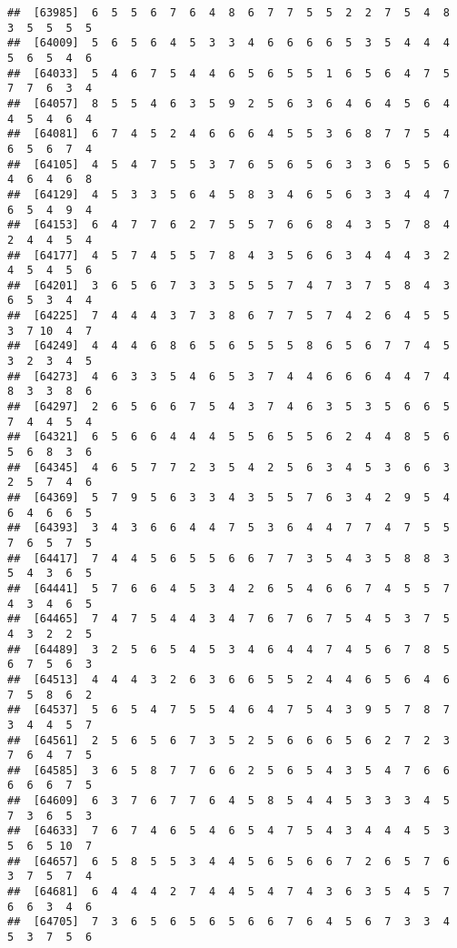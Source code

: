 \documentclass[
]{book}
\begin{document}
\begin{verbatim}
##  [63985]  6  5  5  6  7  6  4  8  6  7  7  5  5  2  2  7  5  4  8  3  5  5  5  5
##  [64009]  5  6  5  6  4  5  3  3  4  6  6  6  6  5  3  5  4  4  4  5  6  5  4  6
##  [64033]  5  4  6  7  5  4  4  6  5  6  5  5  1  6  5  6  4  7  5  7  7  6  3  4
##  [64057]  8  5  5  4  6  3  5  9  2  5  6  3  6  4  6  4  5  6  4  4  5  4  6  4
##  [64081]  6  7  4  5  2  4  6  6  6  4  5  5  3  6  8  7  7  5  4  6  5  6  7  4
##  [64105]  4  5  4  7  5  5  3  7  6  5  6  5  6  3  3  6  5  5  6  4  6  4  6  8
##  [64129]  4  5  3  3  5  6  4  5  8  3  4  6  5  6  3  3  4  4  7  6  5  4  9  4
##  [64153]  6  4  7  7  6  2  7  5  5  7  6  6  8  4  3  5  7  8  4  2  4  4  5  4
##  [64177]  4  5  7  4  5  5  7  8  4  3  5  6  6  3  4  4  4  3  2  4  5  4  5  6
##  [64201]  3  6  5  6  7  3  3  5  5  5  7  4  7  3  7  5  8  4  3  6  5  3  4  4
##  [64225]  7  4  4  4  3  7  3  8  6  7  7  5  7  4  2  6  4  5  5  3  7 10  4  7
##  [64249]  4  4  4  6  8  6  5  6  5  5  5  8  6  5  6  7  7  4  5  3  2  3  4  5
##  [64273]  4  6  3  3  5  4  6  5  3  7  4  4  6  6  6  4  4  7  4  8  3  3  8  6
##  [64297]  2  6  5  6  6  7  5  4  3  7  4  6  3  5  3  5  6  6  5  7  4  4  5  4
##  [64321]  6  5  6  6  4  4  4  5  5  6  5  5  6  2  4  4  8  5  6  5  6  8  3  6
##  [64345]  4  6  5  7  7  2  3  5  4  2  5  6  3  4  5  3  6  6  3  2  5  7  4  6
##  [64369]  5  7  9  5  6  3  3  4  3  5  5  7  6  3  4  2  9  5  4  6  4  6  6  5
##  [64393]  3  4  3  6  6  4  4  7  5  3  6  4  4  7  7  4  7  5  5  7  6  5  7  5
##  [64417]  7  4  4  5  6  5  5  6  6  7  7  3  5  4  3  5  8  8  3  5  4  3  6  5
##  [64441]  5  7  6  6  4  5  3  4  2  6  5  4  6  6  7  4  5  5  7  4  3  4  6  5
##  [64465]  7  4  7  5  4  4  3  4  7  6  7  6  7  5  4  5  3  7  5  4  3  2  2  5
##  [64489]  3  2  5  6  5  4  5  3  4  6  4  4  7  4  5  6  7  8  5  6  7  5  6  3
##  [64513]  4  4  4  3  2  6  3  6  6  5  5  2  4  4  6  5  6  4  6  7  5  8  6  2
##  [64537]  5  6  5  4  7  5  5  4  6  4  7  5  4  3  9  5  7  8  7  3  4  4  5  7
##  [64561]  2  5  6  5  6  7  3  5  2  5  6  6  6  5  6  2  7  2  3  7  6  4  7  5
##  [64585]  3  6  5  8  7  7  6  6  2  5  6  5  4  3  5  4  7  6  6  6  6  6  7  5
##  [64609]  6  3  7  6  7  7  6  4  5  8  5  4  4  5  3  3  3  4  5  7  3  6  5  3
##  [64633]  7  6  7  4  6  5  4  6  5  4  7  5  4  3  4  4  4  5  3  5  6  5 10  7
##  [64657]  6  5  8  5  5  3  4  4  5  6  5  6  6  7  2  6  5  7  6  3  7  5  7  4
##  [64681]  6  4  4  4  2  7  4  4  5  4  7  4  3  6  3  5  4  5  7  6  6  3  4  6
##  [64705]  7  3  6  5  6  5  6  5  6  6  7  6  4  5  6  7  3  3  4  5  3  7  5  6

\end{verbatim}
\end{document}
